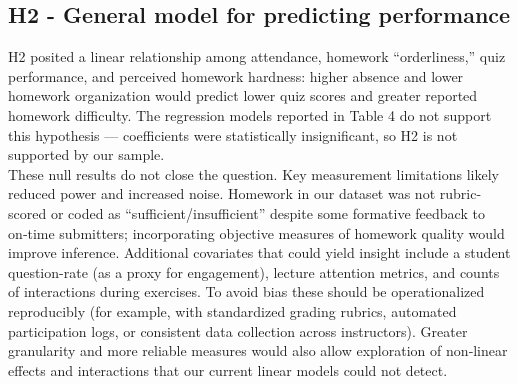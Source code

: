 \documentclass[]{article}
\begin{document}
	
	\subsection{H2 - General model for predicting performance}	
	H2 posited a linear relationship among attendance, homework “orderliness,” quiz performance, and perceived homework hardness: higher absence and lower homework organization would predict lower quiz scores and greater reported homework difficulty. The regression models reported in Table 4 do not support this hypothesis — coefficients were statistically insignificant, so H2 is not supported by our sample.\\
	
	These null results do not close the question. Key measurement limitations likely reduced power and increased noise. Homework in our dataset was not rubric-scored or coded as “sufficient/insufficient” despite some formative feedback to on‑time submitters; incorporating objective measures of homework quality would improve inference. Additional covariates that could yield insight include a student question-rate (as a proxy for engagement), lecture attention metrics, and counts of interactions during exercises. To avoid bias these should be operationalized reproducibly (for example, with standardized grading rubrics, automated participation logs, or consistent data collection across instructors). Greater granularity and more reliable measures would also allow exploration of non‑linear effects and interactions that our current linear models could not detect.
	
\end{document}
